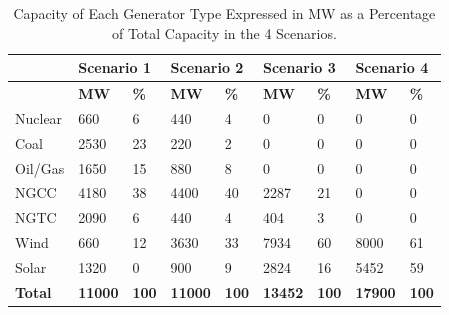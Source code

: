 \documentclass[12pt,LUDisStyle,twosided]{book}
\begin{document}
\begin{table}[H]
\centering
\caption{Capacity of Each Generator Type Expressed in MW as a Percentage of Total Capacity in the 4 Scenarios.}
\begin{tabular}{|lllllll|l|l|}
\hline
               & \multicolumn{2}{l}{\textbf{Scenario 1}} & \multicolumn{2}{l}{\textbf{Scenario 2}} & \multicolumn{2}{l|}{\textbf{Scenario 3}} & \multicolumn{2}{l|}{\textbf{Scenario 4}} \\ \hline
               & \textbf{MW}         & \textbf{\%}       & \textbf{MW}         & \textbf{\%}       & \textbf{MW}          & \textbf{\%}       & \textbf{MW}          & \textbf{\%}       \\ \hline
Nuclear        & 660                 & 6                 & 440                 & 4                 & 0                    & 0                 & 0                    & 0                 \\ \hline
Coal           & 2530                & 23                & 220                 & 2                 & 0                    & 0                 & 0                    & 0                 \\ \hline
Oil/Gas        & 1650                & 15                & 880                 & 8                 & 0                    & 0                 & 0                    & 0                 \\ \hline
NGCC           & 4180                & 38                & 4400                & 40                & 2287                 & 21                & 0                    & 0                 \\ \hline
NGTC           & 2090                & 6                 & 440                 & 4                 & 404                  & 3                 & 0                    & 0                 \\ \hline
Wind           & 660                 & 12                & 3630                & 33                & 7934                 & 60                & 8000                 & 61                \\ \hline
Solar          & 1320                & 0                 & 900                 & 9                 & 2824                 & 16                & 5452                 & 59                \\ \hline
\textbf{Total} & \textbf{11000}      & \textbf{100}      & \textbf{11000}      & \textbf{100}      & \textbf{13452}       & \textbf{100}      & \textbf{17900}       & \textbf{100}      \\ \hline
\end{tabular}
\label{table:ScenarioDataDescription}
\end{table}
\end{document}
